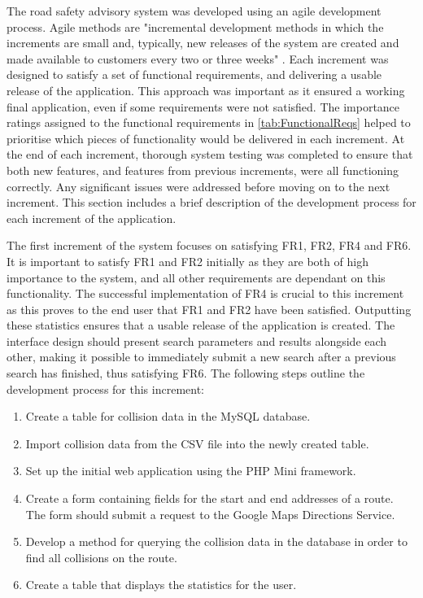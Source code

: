 \documentclass[authoryearcitations]{UoYCSproject}
\begin{document}
The road safety advisory system was developed using an agile development process. Agile methods are "incremental development methods in which the increments are small and, typically, new releases of the system are created and made available to customers every two or three weeks" \citep{Sommerville2005}. Each increment was designed to satisfy a set of functional requirements, and delivering a usable release of the application. This approach was important as it ensured a working final application, even if some requirements were not satisfied. The importance ratings assigned to the functional requirements in \autoref{tab:FunctionalReqs} helped to prioritise which pieces of functionality would be delivered in each increment. At the end of each increment, thorough system testing was completed to ensure that both new features, and features from previous increments, were all functioning correctly. Any significant issues were addressed before moving on to the next increment. This section includes a brief description of the development process for each increment of the application.

The first increment of the system focuses on satisfying FR1, FR2, FR4 and FR6. It is important to satisfy FR1 and FR2 initially as they are both of high importance to the system, and all other requirements are dependant on this functionality. The successful implementation of FR4 is crucial to this increment as this proves to the end user that FR1 and FR2 have been satisfied. Outputting these statistics ensures that a usable release of the application is created. The interface design should present search parameters and results alongside each other, making it possible to immediately submit a new search after a previous search has finished, thus satisfying FR6. The following steps outline the development process for this increment:
\begin{enumerate}
	\item Create a table for collision data in the MySQL database.
	\item Import collision data from the CSV file into the newly created table.
	\item Set up the initial web application using the PHP Mini framework.
	\item Create a form containing fields for the start and end addresses of a route. The form should submit a request to the Google Maps Directions Service.
	\item Develop a method for querying the collision data in the database in order to find all collisions on the route.
	\item Create a table that displays the statistics for the user.
\end{enumerate}
\end{document}
